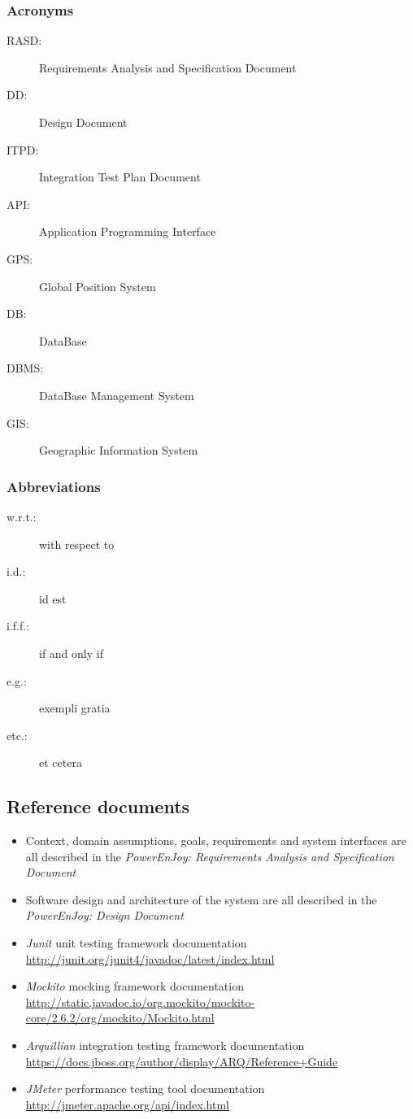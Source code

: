 \subsubsection{Acronyms}
	\begin{description}
		\item [RASD:] Requirements Analysis and Specification Document
		\item [DD:] Design Document
		\item [ITPD:] Integration Test Plan Document
		\item [API:] Application Programming Interface
		\item [GPS:] Global Position System
		\item [DB:] DataBase
		\item [DBMS:] DataBase Management System
		\item [GIS:] Geographic Information System
	\end{description}
\subsubsection{Abbreviations}
	\begin{description}
		\item [w.r.t.:] with respect to
		\item [i.d.:] id est
		\item [i.f.f.:] if and only if
		\item [e.g.:] exempli gratia
		\item [etc.:] et cetera
	\end{description}

\subsection{Reference documents}
\begin{itemize}
\item Context, domain assumptions, goals, requirements and system interfaces are all described in the \emph{PowerEnJoy: Requirements Analysis and Specification Document} \cite{RASD}
\item Software design and architecture of the system are all described in the \emph{PowerEnJoy: Design Document} \cite{DD}
\item \emph{Junit} unit testing framework documentation\\ \url{http://junit.org/junit4/javadoc/latest/index.html}
\item \emph{Mockito} mocking framework documentation\\ \url{http://static.javadoc.io/org.mockito/mockito-core/2.6.2/org/mockito/Mockito.html}
\item \emph{Arquillian} integration testing framework documentation\\ \url{https://docs.jboss.org/author/display/ARQ/Reference+Guide}
\item  \emph{JMeter} performance testing tool documentation\\ \url{http://jmeter.apache.org/api/index.html}
\end{itemize}

